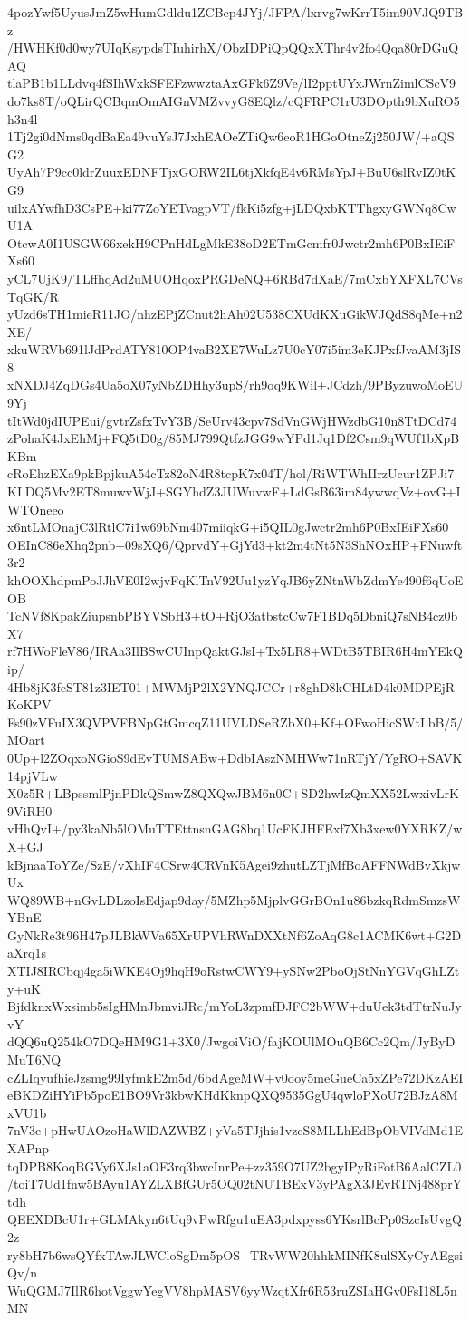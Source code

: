 4pozYwf5UyusJmZ5wHumGdldu1ZCBcp4JYj/JFPA/lxrvg7wKrrT5im90VJQ9TBz
/HWHKf0d0wy7UIqKsypdsTIuhirhX/ObzIDPiQpQQxXThr4v2fo4Qqa80rDGuQAQ
tlaPB1b1LLdvq4fSIhWxkSFEFzwwztaAxGFk6Z9Ve/lI2pptUYxJWrnZimlCScV9
do7ks8T/oQLirQCBqmOmAIGnVMZvvyG8EQlz/cQFRPC1rU3DOpth9bXuRO5h3n4l
1Tj2gi0dNms0qdBaEa49vuYsJ7JxhEAOeZTiQw6eoR1HGoOtneZj250JW/+aQSG2
UyAh7P9cc0ldrZuuxEDNFTjxGORW2IL6tjXkfqE4v6RMsYpJ+BuU6slRvIZ0tKG9
uilxAYwfhD3CsPE+ki77ZoYETvagpVT/fkKi5zfg+jLDQxbKTThgxyGWNq8CwU1A
OtcwA0I1USGW66xekH9CPnHdLgMkE38oD2ETmGcmfr0Jwctr2mh6P0BxIEiFXs60
yCL7UjK9/TLffhqAd2uMUOHqoxPRGDeNQ+6RBd7dXaE/7mCxbYXFXL7CVsTqGK/R
yUzd6sTH1mieR11JO/nhzEPjZCnut2hAh02U538CXUdKXuGikWJQdS8qMe+n2XE/
xkuWRVb691lJdPrdATY810OP4vaB2XE7WuLz7U0cY07i5im3eKJPxfJvaAM3jIS8
xNXDJ4ZqDGs4Ua5oX07yNbZDHhy3upS/rh9oq9KWil+JCdzh/9PByzuwoMoEU9Yj
tItWd0jdIUPEui/gvtrZsfxTvY3B/SeUrv43cpv7SdVnGWjHWzdbG10n8TtDCd74
zPohaK4JxEhMj+FQ5tD0g/85MJ799QtfzJGG9wYPd1Jq1Df2Csm9qWUf1bXpBKBm
cRoEhzEXa9pkBpjkuA54cTz82oN4R8tcpK7x04T/hol/RiWTWhIIrzUcur1ZPJi7
KLDQ5Mv2ET8muwvWjJ+SGYhdZ3JUWuvwF+LdGsB63im84ywwqVz+ovG+IWTOneeo
x6ntLMOnajC3lRtlC7i1w69bNm407miiqkG+i5QIL0gJwctr2mh6P0BxIEiFXs60
OEInC86eXhq2pnb+09sXQ6/QprvdY+GjYd3+kt2m4tNt5N3ShNOxHP+FNuwft3r2
khOOXhdpmPoJJhVE0I2wjvFqKlTnV92Uu1yzYqJB6yZNtnWbZdmYe490f6qUoEOB
TcNVf8KpakZiupsnbPBYVSbH3+tO+RjO3atbstcCw7F1BDq5DbniQ7sNB4cz0bX7
rf7HWoFleV86/IRAa3IlBSwCUInpQaktGJsI+Tx5LR8+WDtB5TBIR6H4mYEkQip/
4Hb8jK3fcST81z3IET01+MWMjP2lX2YNQJCCr+r8ghD8kCHLtD4k0MDPEjRKoKPV
Fs90zVFuIX3QVPVFBNpGtGmcqZ11UVLDSeRZbX0+Kf+OFwoHicSWtLbB/5/MOart
0Up+l2ZOqxoNGioS9dEvTUMSABw+DdbIAszNMHWw71nRTjY/YgRO+SAVK14pjVLw
X0z5R+LBpssmlPjnPDkQSmwZ8QXQwJBM6n0C+SD2hwIzQmXX52LwxivLrK9ViRH0
vHhQvI+/py3kaNb5lOMuTTEttnsnGAG8hq1UcFKJHFExf7Xb3xew0YXRKZ/wX+GJ
kBjnaaToYZe/SzE/vXhIF4CSrw4CRVnK5Agei9zhutLZTjMfBoAFFNWdBvXkjwUx
WQ89WB+nGvLDLzoIsEdjap9day/5MZhp5MjplvGGrBOn1u86bzkqRdmSmzsWYBnE
GyNkRe3t96H47pJLBkWVa65XrUPVhRWnDXXtNf6ZoAqG8c1ACMK6wt+G2DaXrq1s
XTIJ8IRCbqj4ga5iWKE4Oj9hqH9oRstwCWY9+ySNw2PboOjStNnYGVqGhLZty+uK
BjfdknxWxsimb5sIgHMnJbmviJRc/mYoL3zpmfDJFC2bWW+duUek3tdTtrNuJyvY
dQQ6uQ254kO7DQeHM9G1+3X0/JwgoiViO/fajKOUlMOuQB6Cc2Qm/JyByDMuT6NQ
cZLIqyufhieJzsmg99IyfmkE2m5d/6bdAgeMW+v0ooy5meGueCa5xZPe72DKzAEI
eBKDZiHYiPb5poE1BO9Vr3kbwKHdKknpQXQ9535GgU4qwloPXoU72BJzA8MxVU1b
7nV3e+pHwUAOzoHaWlDAZWBZ+yVa5TJjhis1vzcS8MLLhEdBpObVIVdMd1EXAPnp
tqDPB8KoqBGVy6XJs1aOE3rq3bwcInrPe+zz359O7UZ2bgyIPyRiFotB6AalCZL0
/toiT7Ud1fnw5BAyu1AYZLXBfGUr5OQ02tNUTBExV3yPAgX3JEvRTNj488prYtdh
QEEXDBcU1r+GLMAkyn6tUq9vPwRfgu1uEA3pdxpyss6YKsrlBcPp0SzcIsUvgQ2z
ry8bH7b6wsQYfxTAwJLWCloSgDm5pOS+TRvWW20hhkMINfK8ulSXyCyAEgsiQv/n
WuQGMJ7IlR6hotVggwYegVV8hpMASV6yyWzqtXfr6R53ruZSIaHGv0FsI18L5nMN
